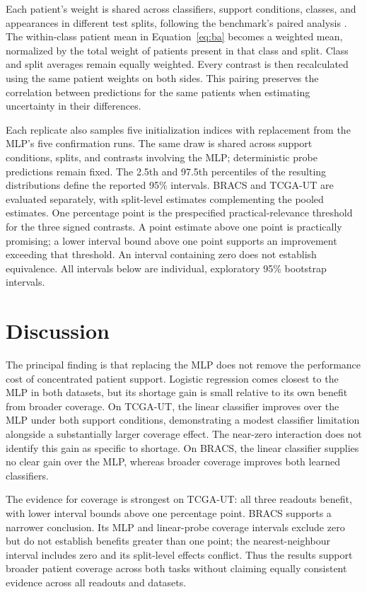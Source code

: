 \documentclass[11pt]{article}
\begin{document}
Each patient's weight is shared across classifiers, support conditions, classes, and appearances in different test splits, following the benchmark's paired analysis \citep{queisler2026benchmarkProtocol}. The within-class patient mean in Equation~\eqref{eq:ba} becomes a weighted mean, normalized by the total weight of patients present in that class and split. Class and split averages remain equally weighted. Every contrast is then recalculated using the same patient weights on both sides. This pairing preserves the correlation between predictions for the same patients when estimating uncertainty in their differences.

Each replicate also samples five initialization indices with replacement from the MLP's five confirmation runs. The same draw is shared across support conditions, splits, and contrasts involving the MLP; deterministic probe predictions remain fixed. The 2.5th and 97.5th percentiles of the resulting distributions define the reported 95\% intervals. BRACS and TCGA-UT are evaluated separately, with split-level estimates complementing the pooled estimates.
One percentage point is the prespecified practical-relevance threshold for the three signed contrasts. A point estimate above one point is practically promising; a lower interval bound above one point supports an improvement exceeding that threshold. An interval containing zero does not establish equivalence. All intervals below are individual, exploratory 95\% bootstrap intervals.



\section{Discussion}
\label{sec:interpretation}
The principal finding is that replacing the MLP does not remove the performance cost of concentrated patient support. Logistic regression comes closest to the MLP in both datasets, but its shortage gain is small relative to its own benefit from broader coverage. On TCGA-UT, the linear classifier improves over the MLP under both support conditions, demonstrating a modest classifier limitation alongside a substantially larger coverage effect. The near-zero interaction does not identify this gain as specific to shortage. On BRACS, the linear classifier supplies no clear gain over the MLP, whereas broader coverage improves both learned classifiers.

The evidence for coverage is strongest on TCGA-UT: all three readouts benefit, with lower interval bounds above one percentage point. BRACS supports a narrower conclusion. Its MLP and linear-probe coverage intervals exclude zero but do not establish benefits greater than one point; the nearest-neighbour interval includes zero and its split-level effects conflict. Thus the results support broader patient coverage across both tasks without claiming equally consistent evidence across all readouts and datasets.
\end{document}
